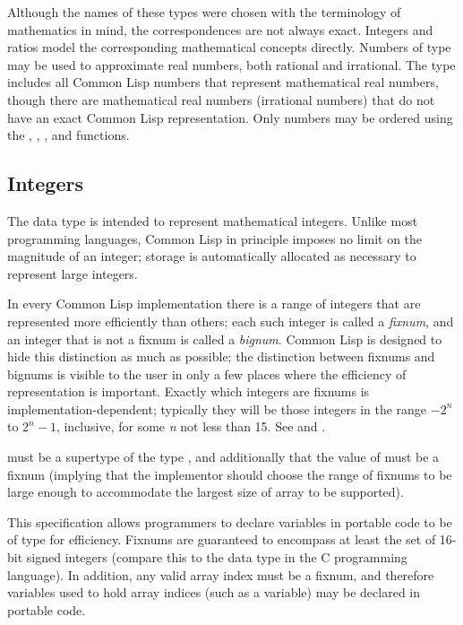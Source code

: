 Although the names of these types were chosen with the
terminology of mathematics in mind, the correspondences
are not always exact.  Integers and ratios model the
corresponding mathematical concepts directly.  Numbers
of type  may be used to approximate real
numbers, both rational and irrational.  The  type
includes all Common Lisp numbers that represent
mathematical real numbers, though there are
mathematical real numbers (irrational numbers)
that do not have an exact Common Lisp representation.
Only  numbers may be ordered using the \cdf{<}, \cdf{>}, \cdf{<=},
and \cdf{>=} functions.

\subsection{Integers}
\label{INTEGERS-SECTION}

The  data type is intended to represent mathematical integers.
Unlike most programming languages, Common Lisp in principle imposes no limit on
the magnitude of an integer; storage
is automatically allocated as necessary to represent large integers.

In every Common Lisp implementation there is a range of integers that are
represented more efficiently than others; each such integer is called a
\emph{fixnum}, and an integer that is not a fixnum is called a
\emph{bignum}.
Common Lisp is designed to hide this distinction as much as possible;
the distinction between fixnums and bignums is visible to
the user in only a few places where the efficiency of representation is
important.  Exactly which integers are
fixnums is implementation-dependent; typically they will be those
integers in the range $-2^{n}$ to $2^{n}-1$,
inclusive, for some \emph{n} not less than 15.
See  and .

 must be a supertype
of the type , and additionally that the value
of  must be a fixnum (implying that the implementor
should choose the range of fixnums to be large enough to accommodate the
largest size of array to be supported).

\beforenoterule
\begin{rationale}
This specification allows programmers to declare variables in portable code
to be of type  for efficiency.  Fixnums are guaranteed to
encompass at least the set of 16-bit signed integers
(compare this to the data type  in the C programming language).
In addition, any valid array index must be a fixnum, and therefore variables
used to hold array indices (such as a  variable)
may be declared  in portable code.
\end{rationale}
\afternoterule

